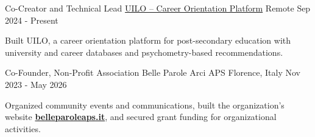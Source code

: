 \begin{cventries}
  \cventry
    {Co-Creator and Technical Lead} %
    {\href{https://www.uilo.it}{UILO -- Career Orientation Platform}} %
    {Remote} %
    {Sep 2024 - Present} %
    {
      \begin{cvitems} %
        \item {Built UILO, a career orientation platform for post-secondary education with university and career databases and psychometry-based recommendations.}
      \end{cvitems}
    }

  \cventry
    {Co-Founder, Non-Profit Association} %
    {Belle Parole Arci APS} %
    {Florence, Italy} %
    {Nov 2023 - May 2026} %
    {
      \begin{cvitems} %
        \item {Organized community events and communications, built the organization's website \href{http://belleparoleaps.it}{\textbf{belleparoleaps.it}}, and secured grant funding for organizational activities.}
      \end{cvitems}
    }



\end{cventries}
